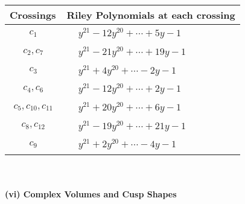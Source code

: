 \documentclass[1p]{elsarticle_modified}
\theoremstyle{definition}
\begin{document}
\begin{tabular}{m{50pt}|m{274pt}}
Crossings & \hspace{64pt}Riley Polynomials at each crossing \\
\hline $$\begin{aligned}c_{1}\end{aligned}$$&$\begin{aligned}
&y^{21}-12 y^{20}+\cdots+5 y-1
\end{aligned}$\\
\hline $$\begin{aligned}c_{2},c_{7}\end{aligned}$$&$\begin{aligned}
&y^{21}-21 y^{20}+\cdots+19 y-1
\end{aligned}$\\
\hline $$\begin{aligned}c_{3}\end{aligned}$$&$\begin{aligned}
&y^{21}+4 y^{20}+\cdots-2 y-1
\end{aligned}$\\
\hline $$\begin{aligned}c_{4},c_{6}\end{aligned}$$&$\begin{aligned}
&y^{21}-12 y^{20}+\cdots+2 y-1
\end{aligned}$\\
\hline $$\begin{aligned}c_{5},c_{10},c_{11}\end{aligned}$$&$\begin{aligned}
&y^{21}+20 y^{20}+\cdots+6 y-1
\end{aligned}$\\
\hline $$\begin{aligned}c_{8},c_{12}\end{aligned}$$&$\begin{aligned}
&y^{21}-19 y^{20}+\cdots+21 y-1
\end{aligned}$\\
\hline $$\begin{aligned}c_{9}\end{aligned}$$&$\begin{aligned}
&y^{21}+2 y^{20}+\cdots-4 y-1
\end{aligned}$\\
\hline
\end{tabular}\\~\\
\newpage\flushleft \textbf{(vi) Complex Volumes and Cusp Shapes}
\end{document}
